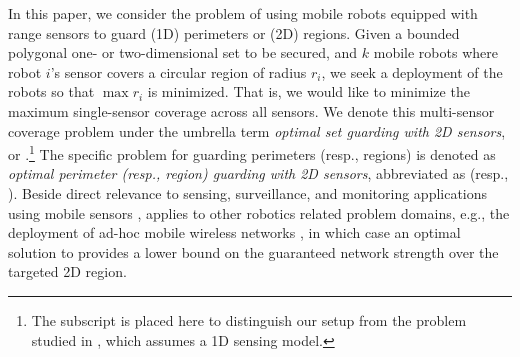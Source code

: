In this paper, we consider the problem of using mobile robots equipped 
with range sensors to guard (1D) perimeters or (2D) regions. Given 
a bounded polygonal one- or two-dimensional set to be secured, 
and $k$ mobile robots where robot $i$'s sensor covers a circular region of 
radius $r_i$, we seek a deployment of the robots so that $\max r_i$ is 
minimized. That is, we would like to minimize the maximum single-sensor 
coverage across all sensors. We denote this multi-sensor coverage problem 
under the umbrella term {\em optimal set guarding with 2D sensors}, or 
\osgt.\footnote{The subscript is placed here to distinguish our setup 
from the \opg problem studied in \cite{fenghangaoyu2019efficient}, which assumes 
a 1D sensing model.} The specific problem for guarding
perimeters (resp., regions) is denoted as {\em optimal perimeter 
(resp., region) guarding with 2D sensors}, abbreviated as \opgt (resp., 
\orgt). Beside direct relevance to sensing, surveillance, and monitoring 
applications using mobile sensors \cite{batalin2002spreading,
cortes2004coverage,fenghangaoyu2019efficient}, \osgt applies to other robotics
related problem domains, e.g., the deployment of ad-hoc mobile wireless 
networks \cite{correll2009ad,gil2012communication}, in which case an 
optimal solution to \osgt provides a lower bound on the guaranteed network 
strength over the targeted 2D region. 

